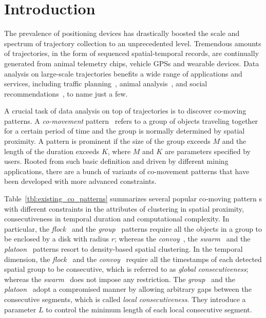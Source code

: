 
\section{Introduction}
The prevalence of positioning devices has drastically boosted 
the scale and spectrum of trajectory collection to an unprecedented level. 
Tremendous amounts of trajectories, in the form of sequenced spatial-temporal 
records, are continually generated from animal telemetry chips, 
vehicle GPSs and wearable devices. Data analysis on large-scale 
trajectories benefits a wide range of applications and services, 
including traffic planning~\cite{zheng2011urban}, animal analysis~\cite{li2010miningperiodic}, and social recommendations~\cite{bao2013survey}, to name just a few.


A crucial task of data analysis on top of trajectories is 
to discover co-moving patterns. A \emph{co-movement} pattern~\cite{li2013managing} 
refers to a group of objects traveling together for a certain period of time 
and the group is normally determined by spatial proximity. 
A pattern is prominent if the size of the group exceeds $M$ and the length of the duration exceeds $K$, where $M$ and $K$ are parameters specified by users. Rooted from such basic definition 
and driven by different mining applications, there are a bunch of variants 
of co-movement patterns that have been developed with more advanced constraints.

Table~\ref{tbl:existing_co_patterns} summarizes several popular co-moving pattern s 
with different constraints in the attributes of clustering in spatial proximity,
consecutiveness in temporal duration and computational complexity. 
In particular,  the \emph{flock}~\cite{gudmundsson2006flock} 
and the \emph{group}~\cite{wang2006grouppattern} patterns require 
all the objects in a group to be enclosed by a disk with radius $r$; 
whereas the \emph{convoy}~\cite{jeung2008convoy}, the \emph{swarm}~\cite{li2010swarm} 
and the \emph{platoon}~\cite{li2015platoon} patterns resort to density-based 
spatial clustering. 
In the temporal dimension, the \emph{flock}~\cite{gudmundsson2006flock} 
and the \emph{convoy}~\cite{jeung2008convoy} require all the timestamps 
of each detected spatial group to be consecutive, which is referred to as \emph{global consecutiveness}; 
whereas the \emph{swarm}~\cite{li2010swarm} does not impose any restriction. 
The \emph{group}~\cite{wang2006grouppattern} and the \emph{platoon}~\cite{li2015platoon} adopt a compromised manner by allowing
arbitrary gaps between the consecutive segments, which is called \emph{local consecutiveness}. 
They introduce a parameter $L$ to control the minimum length of each local consecutive segment.


